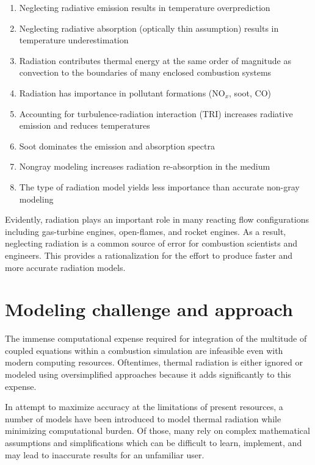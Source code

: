 \begin{enumerate}
    \item Neglecting radiative emission results in temperature overprediction \cite{Gamil2020AssessmentChamber}
    \item Neglecting radiative absorption (optically thin assumption) results in temperature underestimation
    \item Radiation contributes thermal energy at the same order of magnitude as convection to the boundaries of many enclosed combustion systems \cite{Gamil2020AssessmentChamber,Johnson2021AnalysisMethod}
    \item Radiation has importance in pollutant formations (NO${}_x$, soot, CO) \cite{Ihme2008ModelingFormulation,Habibi2007TurbulenceFlames}
    \item Accounting for turbulence-radiation interaction (TRI) increases radiative emission and reduces temperatures
    \item Soot dominates the emission and absorption spectra
    \item Nongray modeling increases radiation re-absorption in the medium\cite{Wu2021LimitationsFires}
    \item The type of radiation model yields less importance than accurate non-gray modeling
\end{enumerate}

Evidently, radiation plays an important role in many reacting flow configurations including gas-turbine engines, open-flames, and rocket engines.
As a result, neglecting radiation is a common source of error for combustion scientists and engineers. 
This provides a rationalization for the effort to produce faster and more accurate radiation models.

\section{Modeling challenge and approach}
The immense computational expense required for integration of the multitude of coupled equations within a combustion simulation are infeasible even with modern computing resources. Oftentimes, thermal radiation is either ignored or modeled using oversimplified approaches because it adds significantly to this expense.

In attempt to maximize accuracy at the limitations of present resources, a number of models have been introduced to model thermal radiation while minimizing computational burden.
Of those, many rely on complex mathematical assumptions and simplifications which can be difficult to learn, implement, and may lead to inaccurate results for an unfamiliar user. 


